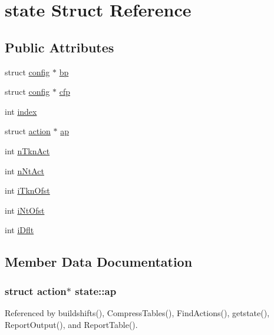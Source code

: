\hypertarget{structstate}{\section{state Struct Reference}
\label{structstate}
}
\subsection*{Public Attributes}
\begin{DoxyCompactItemize}
\item 
struct \hyperlink{structconfig}{config} $\ast$ \hyperlink{structstate_a09633c6d7dd89ec1bd86c5e55b51128b}{bp}
\item 
struct \hyperlink{structconfig}{config} $\ast$ \hyperlink{structstate_a1e54836d6c64845338d17c076ba145f3}{cfp}
\item 
int \hyperlink{structstate_a3710ff75625cc669e86b54029bb944bb}{index}
\item 
struct \hyperlink{structaction}{action} $\ast$ \hyperlink{structstate_a9edbd946d98aba66f182e6ebf8185d7f}{ap}
\item 
int \hyperlink{structstate_a2f282b0c7be7363f1e6b516fc04ec3df}{n\-Tkn\-Act}
\item 
int \hyperlink{structstate_a1e83b06b14c77fff6ca0cd1439991a3a}{n\-Nt\-Act}
\item 
int \hyperlink{structstate_a8b8000826bd6bdea4863293f586efc1b}{i\-Tkn\-Ofst}
\item 
int \hyperlink{structstate_a76c5eafaf09d92e514623f3f3171fba6}{i\-Nt\-Ofst}
\item 
int \hyperlink{structstate_aa635d045a97d216a756a9603fd9c9c76}{i\-Dflt}
\end{DoxyCompactItemize}


\subsection{Member Data Documentation}
\hypertarget{structstate_a9edbd946d98aba66f182e6ebf8185d7f}{
\subsubsection[{ap}]{\setlength{\rightskip}{0pt plus 5cm}struct {\bf action}$\ast$ state\-::ap}}\label{structstate_a9edbd946d98aba66f182e6ebf8185d7f}


Referenced by buildshifts(), Compress\-Tables(), Find\-Actions(), getstate(), Report\-Output(), and Report\-Table().

